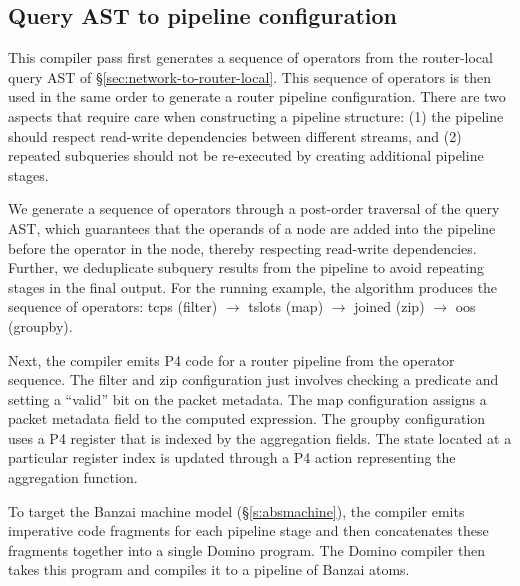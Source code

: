 \subsection{Query AST to pipeline configuration}
\label{sec:pipeline-layout}

This compiler pass first generates a sequence of operators from the
router-local query AST of \S\ref{sec:network-to-router-local}. This sequence of
operators is then used in the same order to generate a router pipeline
configuration. There are two aspects that require care when constructing a
pipeline structure: (1) the pipeline should respect read-write dependencies
between different streams, and (2) repeated subqueries should not be
re-executed by creating additional pipeline stages.

We generate a sequence of operators through a post-order traversal of the query
AST, which guarantees that the operands of a node are added into the pipeline
before the operator in the node, thereby respecting read-write dependencies.
Further, we deduplicate subquery results from the pipeline to avoid repeating
stages in the final output. For the running example, the algorithm produces the
sequence of operators: {\ct tcps} ({\ct filter}) $\rightarrow$ {\ct tslots}
({\ct map}) $\rightarrow$ {\ct joined} ({\ct zip}) $\rightarrow$ {\ct oos}
({\ct groupby}).

Next, the compiler emits P4 code for a router pipeline from the operator
sequence.  The {\ct filter} and {\ct zip} configuration just involves checking
a predicate and setting a ``valid'' bit on the packet metadata. The {\ct map}
configuration assigns a packet metadata field to the computed expression. The
{\ct groupby} configuration uses a P4 register that is indexed by the
aggregation fields. The state located at a particular register index is updated
through a P4 action representing the aggregation function.


To target the Banzai machine model (\S\ref{s:absmachine}), the \TheSystem
compiler emits imperative code fragments for each pipeline stage and then
concatenates these fragments together into a single Domino program. The Domino
compiler then takes this program and compiles it to a pipeline of Banzai atoms.
